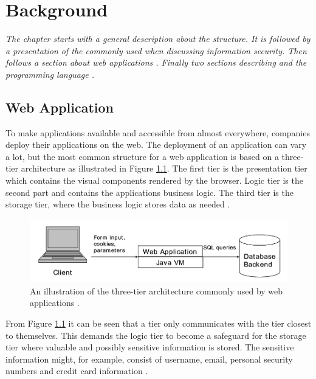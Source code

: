 \chapter{Background}
\label{Background}
\textit{The chapter starts with a general description about the \textit{} structure. It is followed by a presentation of the \textit{} commonly used when discussing information security. Then follows a section about web applications \textit{}. Finally two sections describing \textit{} and the programming language \textit{}.}



\section{Web Application}
\label{WebApplication}
To make applications available and accessible from almost everywhere, companies deploy their applications on the web. The deployment of an application can vary a lot, but the most common structure for a web application is based on a three-tier architecture as illustrated in Figure \ref{fig:webApplication-Haldar}. The first tier is the presentation tier which contains the visual components rendered by the browser. Logic tier is the second part and contains the applications business logic. The third tier is the storage tier, where the business logic stores data as needed \parencite{JustinClarke-Salt2009SIAa}.
 
\begin{figure}[H]
  \centering
  \includegraphics[width=\textwidth]{images/webApplication-Haldar.png}
  \caption{An illustration of the three-tier architecture commonly used by web applications \cite{Haldar}.}
  \label{fig:webApplication-Haldar}
\end{figure}

From Figure \ref{fig:webApplication-Haldar} it can be seen that a tier only communicates with the tier closest to themselves. This demands the logic tier to become a safeguard for the storage tier where valuable and possibly sensitive information is stored. The sensitive information might, for example, consist of username, email, personal security numbers and credit card information \parencite{JustinClarke-Salt2009SIAa}.

